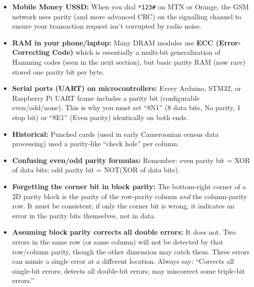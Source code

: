 \documentclass[11pt]{article}
\newcounter{popsec}
\newcounter{popsub}
\newcommand{\courssub}[1]{%
  \stepcounter{popsub}%
  \par\vspace{9pt}\noindent{\popxbold\fontsize{11.5}{13}\selectfont\color{popink}{\color{poporange}\thepopsec.\thepopsub}\hspace{6pt}#1}\par\nopagebreak\vspace{4pt}
}
\begin{document}
\begin{savaistu}
\begin{itemize}
\item \textbf{Mobile Money USSD:} When you dial \texttt{*123\#} on MTN or Orange, the GSM network uses parity (and more advanced CRC) on the signalling channel to ensure your transaction request isn't corrupted by radio noise.
\item \textbf{RAM in your phone/laptop:} Many DRAM modules use \textbf{ECC (Error-Correcting Code)} which is essentially a multi-bit generalization of Hamming codes (seen in the next section), but basic parity RAM (now rare) stored one parity bit per byte.
\item \textbf{Serial ports (UART) on microcontrollers:} Every Arduino, STM32, or Raspberry Pi UART frame includes a parity bit (configurable even/odd/none). This is why you must set ``8N1'' (8 data bits, No parity, 1 stop bit) or ``8E1'' (Even parity) identically on both ends.
\item \textbf{Historical:} Punched cards (used in early Cameroonian census data processing) used a parity-like ``check hole'' per column.
\end{itemize}
\end{savaistu}

\begin{attention}
\begin{itemize}
\item \textbf{Confusing even/odd parity formulas:} Remember: even parity bit = XOR of data bits; odd parity bit = NOT(XOR of data bits).
\item \textbf{Forgetting the corner bit in block parity:} The bottom-right corner of a 2D parity block is the parity of the row-parity column \emph{and} the column-parity row. It must be consistent; if only the corner bit is wrong, it indicates an error in the parity bits themselves, not in data.
\item \textbf{Assuming block parity corrects all double errors:} It does not. Two errors in the same row (or same column) will not be detected by that row/column parity, though the other dimension may catch them. Three errors can mimic a single error at a different location. Always say: ``Corrects all single-bit errors; detects all double-bit errors; may miscorrect some triple-bit errors.''
\end{itemize}
\end{attention}

\courssub{Summary}
\end{document}
